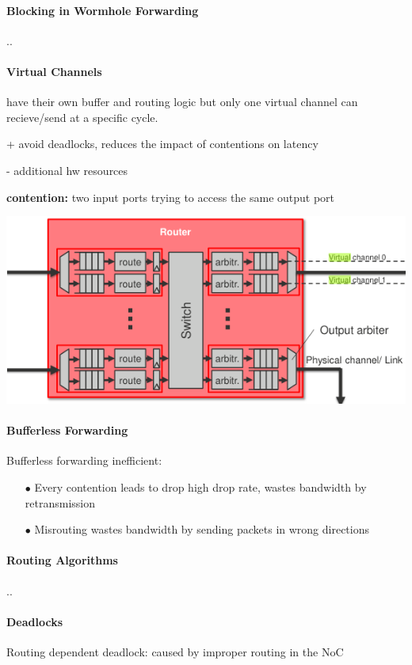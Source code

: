 \documentclass[fontsize=8pt]{scrartcl}
\begin{document}
\begin{multicols*}{4}
\paragraph{Blocking in Wormhole Forwarding}..

\paragraph{Virtual Channels} have their own buffer and routing logic but only one virtual channel can recieve/send at a specific cycle.

+ avoid deadlocks, reduces the impact of contentions on latency

- additional hw resources

\textbf{contention:} two input ports trying to access the same output port


\begin{center}
  \includegraphics[width=0.8\linewidth]{img/virtual_channel.png}
  \label{fig:virtual_channel}
\end{center}

\paragraph{Bufferless Forwarding}
Bufferless forwarding inefficient: 
\begin{enumerate}
  \item[$\bullet$] Every contention leads to drop high drop rate, wastes bandwidth by retransmission
  \item[$\bullet$] Misrouting wastes bandwidth by sending packets in wrong directions
\end{enumerate}

\paragraph{Routing Algorithms}..

\paragraph{Deadlocks}
Routing dependent deadlock: caused by improper routing in the NoC


\end{multicols*}
\end{document}
